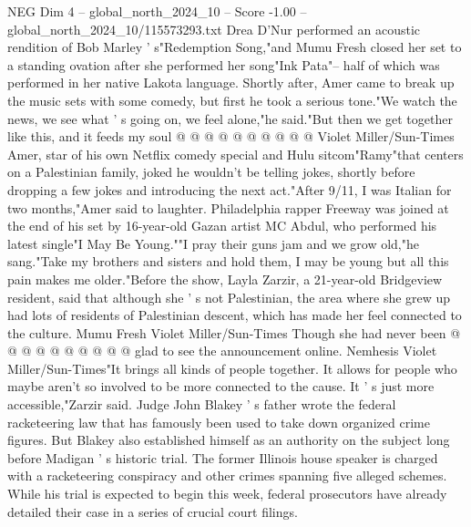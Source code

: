 \begin{textsample}{NEG Dim 4 – global\_north\_2024\_10 – Score -1.00 – global\_north\_2024\_10/115573293.txt}
Drea D'Nur performed an acoustic rendition of Bob Marley ' s"Redemption Song,"and Mumu Fresh closed her set to a standing ovation after she performed her song"Ink Pata"-- half of which was performed in her native Lakota language.
Shortly after, Amer came to break up the music sets with some comedy, but first he took a serious tone."We watch the news, we see what ' s going on, we feel alone,"he said."But then we get together like this, and it feeds my soul @ @ @ @ @ @ @ @ @ @ Violet Miller/Sun-Times Amer, star of his own Netflix comedy special and Hulu sitcom"Ramy"that centers on a Palestinian family, joked he wouldn't be telling jokes, shortly before dropping a few jokes and introducing the next act."After 9/11, I was Italian for two months,"Amer said to laughter.
Philadelphia rapper Freeway was joined at the end of his set by 16-year-old Gazan artist MC Abdul, who performed his latest single"I May Be Young.""I pray their guns jam and we grow old,"he sang."Take my brothers and sisters and hold them, I may be young but all this pain makes me older."Before the show, Layla Zarzir, a 21-year-old Bridgeview resident, said that although she ' s not Palestinian, the area where she grew up had lots of residents of Palestinian descent, which has made her feel connected to the culture.
Mumu Fresh Violet Miller/Sun-Times Though she had never been @ @ @ @ @ @ @ @ @ @ glad to see the announcement online.
Nemhesis Violet Miller/Sun-Times"It brings all kinds of people together.
It allows for people who maybe aren't so involved to be more connected to the cause.
It ' s just more accessible,"Zarzir said.
Judge John Blakey ' s father wrote the federal racketeering law that has famously been used to take down organized crime figures.
But Blakey also established himself as an authority on the subject long before Madigan ' s historic trial.
The former Illinois house speaker is charged with a racketeering conspiracy and other crimes spanning five alleged schemes.
While his trial is expected to begin this week, federal prosecutors have already detailed their case in a series of crucial court filings.

\end{textsample}
